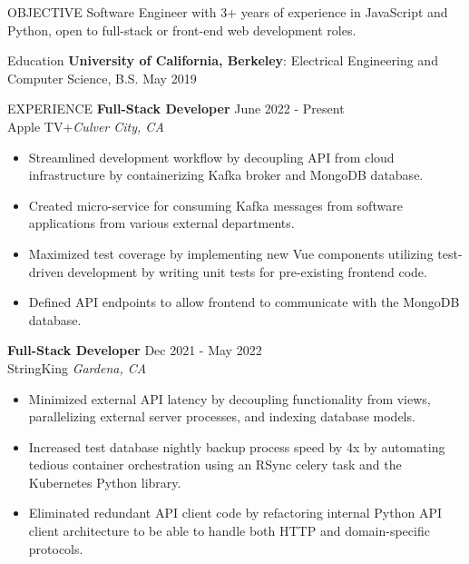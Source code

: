 \documentclass{resume}
\begin{document}
    \begin{rSection}{OBJECTIVE}
        {Software Engineer with 3+ years of experience in JavaScript and Python, open to full-stack or front-end web development roles.}
    \end{rSection}

    \begin{rSection}{Education}
        {\bf University of California, Berkeley}: Electrical Engineering and Computer Science, B.S. \hfill {May 2019}
    \end{rSection}

    \begin{rSection}{EXPERIENCE}
        \textbf{Full-Stack Developer} \hfill June 2022 - Present\\
        Apple TV+\hfill \textit{Culver City, CA}
        \begin{itemize}
            \itemsep -3pt {} 
            \item Streamlined development workflow by decoupling API from cloud infrastructure by containerizing Kafka broker and MongoDB database.
            \item Created micro-service for consuming Kafka messages from software applications from various external departments. 
            \item Maximized test coverage by implementing new Vue components utilizing test-driven development by writing unit tests for pre-existing frontend code.
            \item Defined API endpoints to allow frontend to communicate with the MongoDB database.
        \end{itemize}
        \textbf{Full-Stack Developer} \hfill Dec 2021 - May 2022\\
        StringKing \hfill \textit{Gardena, CA}
        \begin{itemize}
            \itemsep -3pt {} 
            \item Minimized external API latency by decoupling functionality from views, parallelizing external server processes, and indexing database models.
            \item Increased test database nightly backup process speed by 4x by automating tedious container orchestration using an RSync celery task and the Kubernetes Python library.
            \item Eliminated redundant API client code by refactoring internal Python API client architecture to be able to handle both HTTP and domain-specific protocols.
        \end{itemize}

\end{rSection}
\end{document}

